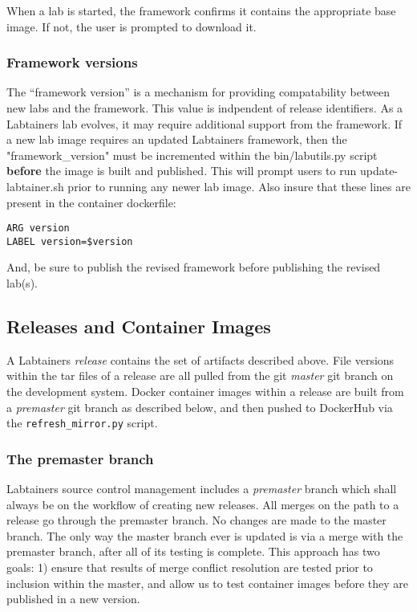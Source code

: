 \documentclass[12pt]{article}
\begin{document}
When a lab is started, the framework confirms it contains the appropriate base image.  If not, the user is prompted to download it.

\subsubsection{Framework versions}
The ``framework version'' is a mechanism for providing compatability between new labs and the framework.  This value is indpendent of
release identifiers. As a Labtainers lab evolves, it may require additional support from the framework.   If a new lab image requires
an updated Labtainers framework, then the "framework\_version" must be incremented within the
bin/labutils.py script \textbf{before} the image is built and published.  This will prompt users
to run update-labtainer.sh prior to running any newer lab image.
Also insure that these lines are present in the container dockerfile:
\begin{verbatim}
ARG version
LABEL version=$version
\end{verbatim}
\noindent And, be sure to publish the revised framework before publishing the revised lab(s).


\subsection{Releases and Container Images}
A Labtainers \textit{release} contains the set of artifacts described above.  File versions within the tar files
of a release are all pulled from the git \textit{master} git branch on the development system.  Docker container images within a release are built from a 
\textit{premaster} git branch as described below, and then pushed to DockerHub via the {\tt refresh\_mirror.py} script.

\subsubsection{The premaster branch}
Labtainers source control management includes a \textit{premaster} branch which shall always be on the workflow of 
creating new releases. All merges on the path to a release go through the premaster branch.  No changes are made to the master
branch.  The only way the master branch ever is updated is via a merge with the premaster branch, after all of its testing is 
complete.  This approach has two goals: 1) ensure that results of merge conflict resolution are tested prior to 
inclusion within the master, and allow us to test container images before they are published in a new version.  
\end{document}
